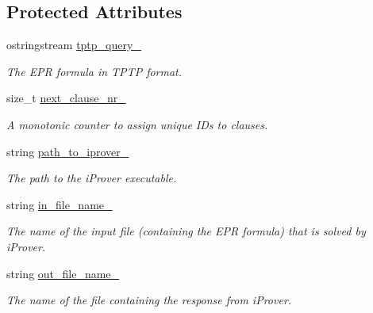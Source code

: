 \subsection*{Protected Attributes}
\begin{DoxyCompactItemize}
\item 
ostringstream \hyperlink{classEPRSynthesizer_a5b9074e1ca3d1a12150c6ae639f475fa}{tptp\-\_\-query\-\_\-}
\begin{DoxyCompactList}\small\item\em The E\-P\-R formula in T\-P\-T\-P format. \end{DoxyCompactList}\item 
size\-\_\-t \hyperlink{classEPRSynthesizer_a14d30bb922f975a1f195965d876784cb}{next\-\_\-clause\-\_\-nr\-\_\-}
\begin{DoxyCompactList}\small\item\em A monotonic counter to assign unique I\-Ds to clauses. \end{DoxyCompactList}\item 
string \hyperlink{classEPRSynthesizer_ac7fc7beb51f9c27e42941e8e20882540}{path\-\_\-to\-\_\-iprover\-\_\-}
\begin{DoxyCompactList}\small\item\em The path to the i\-Prover executable. \end{DoxyCompactList}\item 
string \hyperlink{classEPRSynthesizer_a95c4d232fec2376be891c6ddc96610ce}{in\-\_\-file\-\_\-name\-\_\-}
\begin{DoxyCompactList}\small\item\em The name of the input file (containing the E\-P\-R formula) that is solved by i\-Prover. \end{DoxyCompactList}\item 
string \hyperlink{classEPRSynthesizer_a40ca45e5284a5c24964730beb17d76b8}{out\-\_\-file\-\_\-name\-\_\-}
\begin{DoxyCompactList}\small\item\em The name of the file containing the response from i\-Prover. \end{DoxyCompactList}\end{DoxyCompactItemize}

